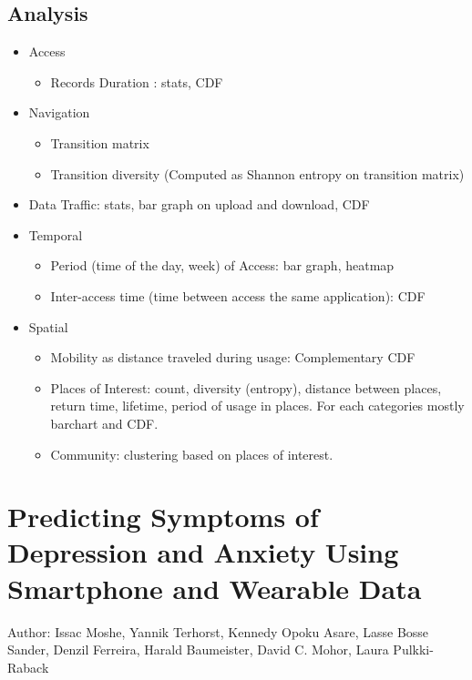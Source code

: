 \subsection{Analysis} 
    \begin{itemize}
        \item Access
            \begin{itemize}
                \item Records Duration : stats, CDF 
            \end{itemize}
        \item Navigation 
            \begin{itemize}
                \item Transition matrix 
                \item Transition diversity (Computed as Shannon entropy on transition matrix)
            \end{itemize}
        \item Data Traffic: stats, bar graph on upload and download, CDF
        \item Temporal 
            \begin{itemize}
                \item Period (time of the day, week) of Access: bar graph, heatmap 
                \item Inter-access time (time between access the same application): CDF
            \end{itemize}
        \item Spatial 
            \begin{itemize}
                \item Mobility as distance traveled during usage: Complementary CDF
                \item Places of Interest: count, diversity (entropy), distance between places, return time, lifetime, period of usage in places. For each categories mostly barchart and CDF. 
                \item Community: clustering based on places of interest. 
            \end{itemize}
        
    \end{itemize}





\newpage    
\section{Predicting Symptoms of Depression and Anxiety Using Smartphone and Wearable Data}
Author: Issac Moshe, Yannik Terhorst, Kennedy Opoku Asare, Lasse Bosse Sander, Denzil Ferreira, Harald Baumeister, David C. Mohor, Laura Pulkki-Raback 

